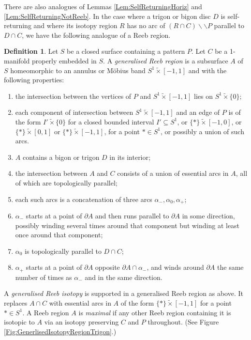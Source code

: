 \documentclass[oneside]{amsart}
\numberwithin{equation}{section}
\theoremstyle{plain}
\theoremstyle{definition}
\newtheorem{definition}[equation]{Definition}
\newcommand{\cut}{\backslash\backslash}
\begin{document}
There are also analogues of Lemmas \ref{Lem:SelfReturningHoriz} and \ref {Lem:SelfReturningNotReeb}. In the case where a trigon or bigon disc $D$ is self-returning and where its isotopy region $R$ has no arc of $(R \cap C) \cut P$ parallel to $D \cap C$, we have the following analogue of a Reeb region.

\begin{definition}
Let $S$ be a closed surface containing a pattern $P$. Let $C$ be a 1-manifold properly embedded in $S$. A \emph{generalised Reeb region} is a subsurface $A$ of $S$ homeomorphic to an annulus or M\"obius band  $S^1 \widetilde{\times} [-1,1]$ and with the following
properties:
\begin{enumerate}
\item the intersection between the vertices of $P$ and $S^1 \widetilde{\times} [-1,1]$ lies on $S^1 \widetilde{\times} \{ 0 \}$;
\item each component of intersection between $S^1 \widetilde{\times} [-1,1]$ and an edge of $P$ is of the form $I' \widetilde{\times} \{ 0 \}$ for a closed bounded interval $I' \subseteq S^1$, or $\{ \ast \} \widetilde{\times} [-1,0] $, or $\{ \ast \} \widetilde{\times} [0,1] $ or $\{ \ast \}  \widetilde{\times} [-1,1]$, for a point $\ast \in S^1$, or possibly a union of such arcs.
\item $A$ contains a bigon or trigon $D$ in its interior;
\item the intersection between $A$ and $C$ consists of a union of essential arcs in $A$, all of which are topologically parallel;
\item each such arcs is a concatenation of three arcs $\alpha_-, \alpha_0, \alpha_+$;
\item $\alpha_-$ starts at a point of $\partial A$ and then runs parallel to $\partial A$ in some direction, possibly winding several times around that component but winding at least once around that component;
\item $\alpha_0$ is topologically parallel to $D \cap C$;
\item $\alpha_+$ starts at a point of $\partial A$ opposite $\partial A \cap \alpha_-$, and winds around $\partial A$ the same number of times as $\alpha_-$ and in the same direction.
\end{enumerate}
A \emph{generalised Reeb isotopy} is supported in a generalised Reeb region as above. It replaces $A \cap C$ with essential arcs in $A$ of the form $\{ \ast \} \widetilde{\times} [-1,1]$ for a point $\ast \in S^1$. A Reeb region $A$ is \emph{maximal} if any other Reeb region containing it is isotopic to $A$ via an isotopy preserving $C$ and $P$ throughout. (See Figure \ref{Fig:GenerlisedIsotopyRegionTrigon}.)
\end{definition}
\end{document}
